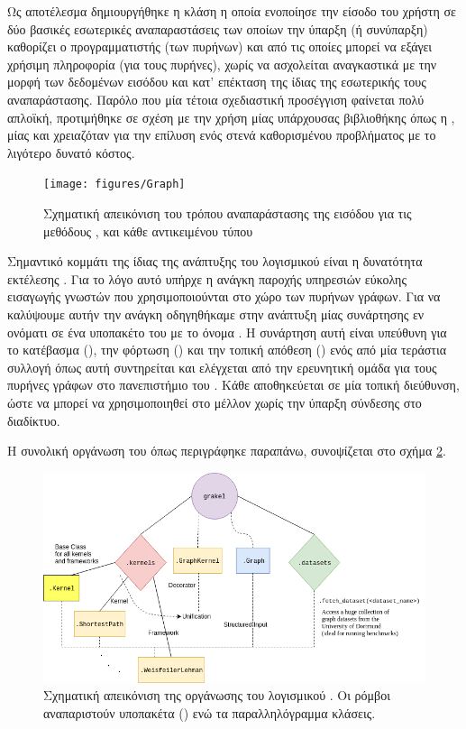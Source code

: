Ως αποτέλεσμα δημιουργήθηκε η κλάση  η οποία ενοποίησε την είσοδο του χρήστη σε δύο βασικές εσωτερικές αναπαραστάσεις των οποίων την ύπαρξη (ή συνύπαρξη) καθορίζει ο προγραμματιστής (των πυρήνων) και από τις οποίες μπορεί να εξάγει χρήσιμη πληροφορία (για τους πυρήνες), χωρίς να ασχολείται αναγκαστικά με την μορφή των δεδομένων εισόδου και κατ' επέκταση της ίδιας της εσωτερικής τους αναπαράστασης.
Παρόλο που μία τέτοια σχεδιαστική προσέγγιση φαίνεται πολύ απλοϊκή, προτιμήθηκε σε σχέση με την χρήση μίας υπάρχουσας βιβλιοθήκης όπως η , μίας και χρειαζόταν για την επίλυση ενός στενά καθορισμένου προβλήματος με το λιγότερο δυνατό κόστος.

\begin{figure}[]
    \centering
    \texttt{[image: figures/Graph]}
    \caption{Σχηματική απεικόνιση του τρόπου αναπαράστασης της εισόδου για τις μεθόδους \texttt{}, \texttt{} και \texttt{} κάθε αντικειμένου τύπου }
    \label{fig:graph}
\end{figure}

Σημαντικό κομμάτι της ίδιας της ανάπτυξης του λογισμικού είναι η δυνατότητα εκτέλεσης .
Για το λόγο αυτό υπήρχε η ανάγκη παροχής υπηρεσιών εύκολης εισαγωγής γνωστών  που χρησιμοποιούνται στο χώρο των πυρήνων γράφων.
Για να καλύψουμε αυτήν την ανάγκη οδηγηθήκαμε στην ανάπτυξη μίας συνάρτησης εν ονόματι  σε ένα υποπακέτο του  με το όνομα .
Η συνάρτηση αυτή είναι υπεύθυνη για το κατέβασμα (), την φόρτωση () και την τοπική απόθεση () ενός  από μία τεράστια συλλογή όπως αυτή συντηρείται και ελέγχεται από την ερευνητική ομάδα για τους πυρήνες γράφων στο πανεπιστήμιο του  \cite{KKMMN2016}. Κάθε  αποθηκεύεται σε μία τοπική διεύθυνση, ώστε να μπορεί να χρησιμοποιηθεί στο μέλλον χωρίς την ύπαρξη σύνδεσης στο διαδίκτυο.

Η συνολική οργάνωση του  όπως περιγράφηκε παραπάνω, συνοψίζεται στο σχήμα \ref{fig:grakel}.
\begin{figure}[]
    \centering
    \includegraphics[width=\textwidth]{figures/grakel-schema}
    \caption[Σχηματική απεικόνιση της οργάνωσης του λογισμικού ]{Σχηματική απεικόνιση της οργάνωσης του λογισμικού . Οι ρόμβοι αναπαριστούν υποπακέτα () ενώ τα παραλληλόγραμμα κλάσεις.}
    \label{fig:grakel}
\end{figure}
